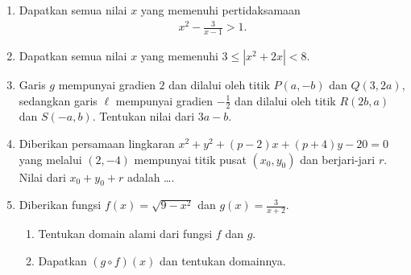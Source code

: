 \documentclass[10pt,openany,a4paper]{article}
\theoremstyle{definition}
\theoremstyle{definition}
\theoremstyle{plain}
\begin{document}
        \begin{enumerate}
            \item Dapatkan semua nilai $x$ yang memenuhi pertidaksamaan 
            \begin{align*}
                x^2-\frac{3}{x-1}>1.
            \end{align*}
            \item Dapatkan semua nilai $x$ yang memenuhi $3\leq |x^2+2x|<8$.
            \item Garis $g$ mempunyai gradien $2$ dan dilalui oleh titik $P(a,-b)$ dan $Q(3,2a)$, sedangkan garis $\ell$ mempunyai gradien $-\frac{1}{2}$ dan dilalui oleh titik $R(2b,a)$ dan $S(-a,b)$. Tentukan nilai dari $3a-b$.
            \item Diberikan persamaan lingkaran $x^2+y^2+(p-2)x+(p+4)y-20=0$ yang melalui $(2,-4)$ mempunyai titik pusat $(x_0,y_0)$ dan berjari-jari $r$. Nilai dari $x_0+y_0+r$ adalah \dots.
            \item Diberikan fungsi $f(x)=\sqrt{9-x^2}$ dan $g(x)=\frac{3}{x+2}$. 
            \begin{enumerate}
                \item Tentukan domain alami dari fungsi $f$ dan $g$.
                \item Dapatkan $(g\circ f)(x)$ dan tentukan domainnya.
            \end{enumerate}
        \end{enumerate}

\end{document}
